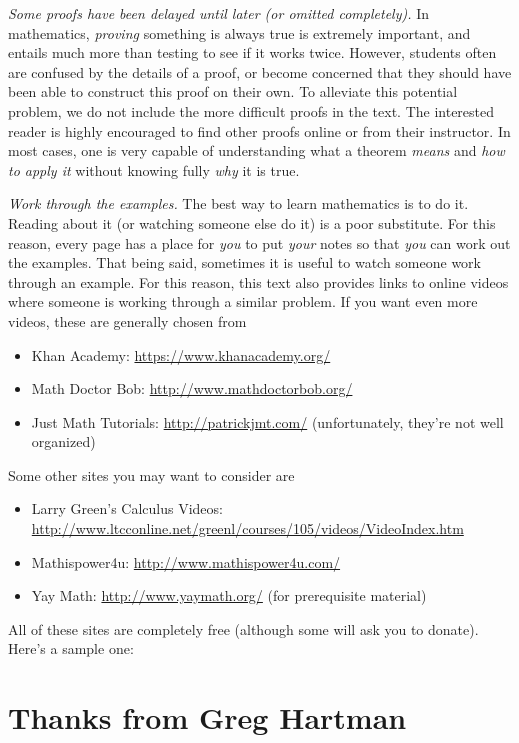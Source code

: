 \emph{Some proofs have been delayed until later (or omitted completely).} In mathematics, \emph{proving} something is always true is extremely important, and entails much more than testing to see if it works twice. However, students often are confused by the details of a proof, or become concerned that they should have been able to construct this proof on their own. To alleviate this potential problem, we do not include the more difficult proofs in the text. The interested reader is highly encouraged to find other proofs online or from their instructor. In most cases, one is very capable of understanding what a theorem \emph{means} and \emph{how to apply it} without knowing fully \emph{why} it is true.

\emph{Work through the examples.}  The best way to learn mathematics is to do it.  Reading about it (or watching someone else do it) is a poor substitute.  For this reason, every page has a place for \emph{you} to put \emph{your} notes so that \emph{you} can work out the examples.  That being said, sometimes it is useful to watch someone work through an example.  For this reason, this text also provides links to online videos where someone is working through a similar problem.  If you want even more videos, these are generally chosen from
\begin{itemize}
\item Khan Academy: \url{https://www.khanacademy.org/}
\item Math Doctor Bob: \url{http://www.mathdoctorbob.org/}
\item Just Math Tutorials: \url{http://patrickjmt.com/} (unfortunately, they're not well organized)
\end{itemize}
Some other sites you may want to consider are
\begin{itemize}
\item Larry Green's Calculus Videos: \url{http://www.ltcconline.net/greenl/courses/105/videos/VideoIndex.htm}
\item Mathispower4u: \url{http://www.mathispower4u.com/}
\item Yay Math: \url{http://www.yaymath.org/} (for prerequisite material)
\end{itemize}
All of these sites are completely free (although some will ask you to donate).  Here's a sample one:



\section*{Thanks from Greg Hartman}

